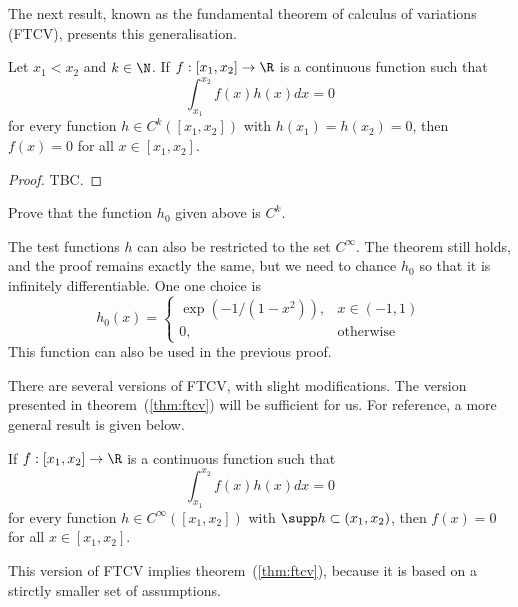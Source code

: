 The next result, known as the fundamental theorem of calculus of variations (FTCV), presents this generalisation.
\begin{nthm}
  \label{thm:ftcv}
  Let $x_1 < x_2$ and $k \in \N$. If $f : [x_1, x_2] \to \R$ is a continuous function such that
  \begin{equation}
    \label{eq:ftcv}
    \int_{x_1}^{x_2} f(x) h(x) dx = 0
  \end{equation}
  for every function $h \in C^{k}([x_1, x_2])$ with $h(x_1)=h(x_2)=0$, then $f(x)=0$ for all $x \in [x_1, x_2]$.
\end{nthm}
\begin{proof}
  TBC.
\end{proof}

\begin{nex}
  Prove that the function $h_0$ given above is $C^{k}$.
\end{nex}

The test functions $h$ can also be restricted to the set $C^{\infty}$. The theorem still holds, and the proof remains exactly the same, but we need to chance $h_0$ so that it is infinitely differentiable. One one choice is
\begin{equation}
  h_0(x) = \begin{cases}\exp(-1/(1-x^2)), & x \in (-1,1)\\ 0, &\text{otherwise}\end{cases}
\end{equation}
This function can also be used in the previous proof.

There are several versions of FTCV, with slight modifications. The version presented in theorem~(\ref{thm:ftcv}) will be sufficient for us. For reference, a more general result is given below.
\begin{nthm}
  \label{thm:ftcv-supp}
  If $f : [x_1, x_2] \to \R$ is a continuous function such that
  \begin{equation}
    \label{eq:ftcv}
    \int_{x_1}^{x_2} f(x) h(x) dx = 0
  \end{equation}
  for every function $h \in C^{\infty}([x_1, x_2])$ with $\supp h \subset (x_1, x_2)$, then $f(x)=0$ for all $x \in [x_1, x_2]$.
\end{nthm}
This version of FTCV implies theorem~(\ref{thm:ftcv}), because it is based on a stirctly smaller set of assumptions.
